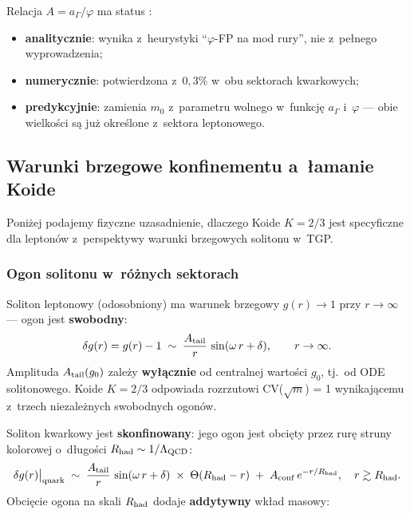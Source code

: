 \begin{remark}\label{rem:X-A-status}
Relacja $A = a_\Gamma/\varphi$ ma status
:
\begin{itemize}[nosep]
  \item \textbf{analitycznie}: wynika z~heurystyki
    ``$\varphi$-FP na mod rury'', nie z~pe\l{}nego
    wyprowadzenia;
  \item \textbf{numerycznie}: potwierdzona z~$0{,}3\%$
    w~obu sektorach kwarkowych;
  \item \textbf{predykcyjnie}: zamienia $m_0$ z~parametru
    wolnego w~funkcj\k{e} $a_\Gamma$ i~$\varphi$ --- obie
    wielko\'sci s\k{a} ju\.z okre\'slone z~sektora
    leptonowego.
\end{itemize}
\end{remark}

\subsection{Warunki brzegowe konfinementu a~\l{}amanie Koide}%
\label{app:X-confinement-bc}

Poni\.zej podajemy fizyczne uzasadnienie, dlaczego Koide $K = 2/3$
jest specyficzne dla lepton\'ow z~perspektywy warunki brzegowych
solitonu w~TGP.

\subsubsection{Ogon solitonu w~r\'o\.znych sektorach}

Soliton leptonowy (odosobniony) ma warunek brzegowy
$g(r) \to 1$ przy $r \to \infty$ --- ogon jest \textbf{swobodny}:
\begin{equation}\label{eq:X-free-tail}
  \delta g(r) = g(r) - 1 \;\sim\; \frac{A_{\rm tail}}{r}\,
  \sin(\omega\,r + \delta), \qquad r \to \infty.
\end{equation}
Amplituda $A_{\rm tail}(g_0)$ zale\.zy \textbf{wy\l{}\k{a}cznie}
od centralnej warto\'sci $g_0$, tj.\ od ODE solitonowego.
Koide $K = 2/3$ odpowiada rozrzutowi CV($\sqrt{m}$) = 1
wynikaj\k{a}cemu z~trzech niezale\.znych swobodnych ogon\'ow.

Soliton kwarkowy jest \textbf{skonfinowany}: jego ogon jest
obci\k{e}ty przez rur\k{e} struny kolorowej o~d\l{}ugo\'sci
$R_{\rm had} \sim 1/\Lambda_{\rm QCD}$:
\begin{equation}\label{eq:X-confined-tail}
  \delta g(r)\big|_{\rm quark} \;\sim\;
  \frac{A_{\rm tail}}{r}\,\sin(\omega\,r + \delta)\;
  \times\; \Theta(R_{\rm had} - r)
  \;+\; A_{\rm conf}\,e^{-r/R_{\rm had}},
  \quad r \gtrsim R_{\rm had}.
\end{equation}
Obci\k{e}cie ogona na skali $R_{\rm had}$ dodaje
\textbf{addytywny} wk\l{}ad masowy:

